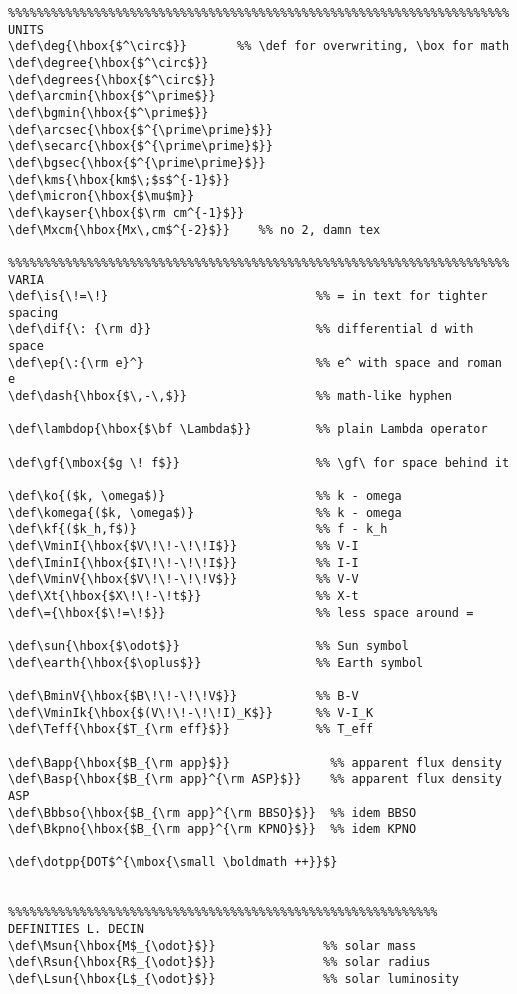 {\begin{verbatim}
%%%%%%%%%%%%%%%%%%%%%%%%%%%%%%%%%%%%%%%%%%%%%%%%%%%%%%%%%%%%%%%%%%%%%% UNITS
\def\deg{\hbox{$^\circ$}}       %% \def for overwriting, \box for math
\def\degree{\hbox{$^\circ$}}
\def\degrees{\hbox{$^\circ$}}
\def\arcmin{\hbox{$^\prime$}}
\def\bgmin{\hbox{$^\prime$}}
\def\arcsec{\hbox{$^{\prime\prime}$}}
\def\secarc{\hbox{$^{\prime\prime}$}}
\def\bgsec{\hbox{$^{\prime\prime}$}}
\def\kms{\hbox{km$\;$s$^{-1}$}}
\def\micron{\hbox{$\mu$m}}
\def\kayser{\hbox{$\rm cm^{-1}$}}
\def\Mxcm{\hbox{Mx\,cm$^{-2}$}}    %% no 2, damn tex

%%%%%%%%%%%%%%%%%%%%%%%%%%%%%%%%%%%%%%%%%%%%%%%%%%%%%%%%%%%%%%%%%%%%%% VARIA
\def\is{\!=\!}                             %% = in text for tighter spacing
\def\dif{\: {\rm d}}                       %% differential d with space
\def\ep{\:{\rm e}^}                        %% e^ with space and roman e
\def\dash{\hbox{$\,-\,$}}                  %% math-like hyphen

\def\lambdop{\hbox{$\bf \Lambda$}}         %% plain Lambda operator

\def\gf{\mbox{$g \! f$}}                   %% \gf\ for space behind it

\def\ko{($k, \omega$)}                     %% k - omega 
\def\komega{($k, \omega$)}                 %% k - omega 
\def\kf{($k_h,f$)}                         %% f - k_h
\def\VminI{\hbox{$V\!\!-\!\!I$}}           %% V-I
\def\IminI{\hbox{$I\!\!-\!\!I$}}           %% I-I
\def\VminV{\hbox{$V\!\!-\!\!V$}}           %% V-V
\def\Xt{\hbox{$X\!\!-\!t$}}                %% X-t
\def\={\hbox{$\!=\!$}}                     %% less space around =

\def\sun{\hbox{$\odot$}}                   %% Sun symbol
\def\earth{\hbox{$\oplus$}}                %% Earth symbol

\def\BminV{\hbox{$B\!\!-\!\!V$}}           %% B-V
\def\VminIk{\hbox{$(V\!\!-\!\!I)_K$}}      %% V-I_K
\def\Teff{\hbox{$T_{\rm eff}$}}            %% T_eff

\def\Bapp{\hbox{$B_{\rm app}$}}              %% apparent flux density
\def\Basp{\hbox{$B_{\rm app}^{\rm ASP}$}}    %% apparent flux density ASP
\def\Bbbso{\hbox{$B_{\rm app}^{\rm BBSO}$}}  %% idem BBSO
\def\Bkpno{\hbox{$B_{\rm app}^{\rm KPNO}$}}  %% idem KPNO

\def\dotpp{DOT$^{\mbox{\small \boldmath ++}}$}


%%%%%%%%%%%%%%%%%%%%%%%%%%%%%%%%%%%%%%%%%%%%%%%%%%%%%%%%%%%% DEFINITIES L. DECIN
\def\Msun{\hbox{M$_{\odot}$}}               %% solar mass
\def\Rsun{\hbox{R$_{\odot}$}}               %% solar radius
\def\Lsun{\hbox{L$_{\odot}$}}               %% solar luminosity


\end{verbatim}}
